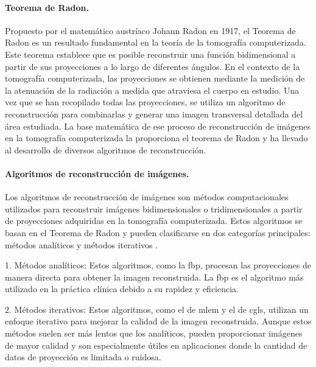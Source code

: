 \paragraph{Teorema de Radon.}
Propuesto por el matemático austríaco Johann Radon en 1917, el Teorema de Radon es un resultado fundamental en la teoría de la tomografía computerizada. Este teorema establece que es posible reconstruir una función bidimensional a partir de sus proyecciones a lo largo de diferentes ángulos. En el contexto de la tomografía computerizada, las proyecciones se obtienen mediante la medición de la atenuación de la radiación a medida que atraviesa el cuerpo en estudio.
Una vez que se han recopilado todas las proyecciones, se utiliza un algoritmo de reconstrucción para combinarlas y generar una imagen transversal detallada del área estudiada. La base matemática de ese proceso de reconstrucción de imágenes en la tomografía computerizada la proporciona el teorema de Radon y ha llevado al desarrollo de diversos algoritmos de reconstrucción.


\paragraph{Algoritmos de reconstrucción de imágenes.}
Los algoritmos de reconstrucción de imágenes son métodos computacionales utilizados para reconstruir imágenes bidimensionales o tridimensionales a partir de proyecciones adquiridas en la tomografía computerizada. Estos algoritmos se basan en el Teorema de Radon y pueden clasificarse en dos categorías principales: métodos analíticos \cite{kontaxakis2002reconstruccion} y métodos iterativos \cite{Willemink2013}.

1. Métodos analíticos: Estos algoritmos, como la \acrfull{fbp}, procesan las proyecciones de manera directa para obtener la imagen reconstruida. La \acrshort{fbp} es el algoritmo más utilizado en la práctica clínica debido a su rapidez y eficiencia.

2. Métodos iterativos: Estos algoritmos, como el de \acrfull{mlem} y el de \acrfull{cgls}, utilizan un enfoque iterativo para mejorar la calidad de la imagen reconstruida. Aunque estos métodos suelen ser más lentos que los analíticos, pueden proporcionar imágenes de mayor calidad y son especialmente útiles en aplicaciones donde la cantidad de datos de proyección es limitada o ruidosa.



